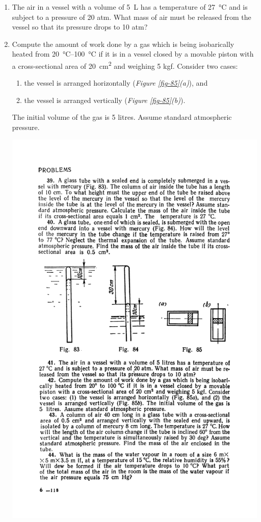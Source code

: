 \documentclass[a4paper,sfsidenotes]{tufte-book}
\begin{document}
\begin{enumerate}[resume=problems]
\item The air in a vessel with a volume of \SI{5}{\liter} has a temperature of \SI{27}{\degreeCelsius} and is subject to a pressure of 20 atm. What mass of air must be released from the vessel so that its pressure drops to 10 atm?
\item Compute the amount of work done by a gas which is being isobarically heated from \SIrange{20}{100}{\degreeCelsius} if it is in a vessel closed by a movable piston with a cross-sectional area of \SI{20}{\centi\meter^{2}} and weighing 5 kgf. Consider two cases: 
\begin{enumerate}
\item the vessel is arranged horizontally (\emph{Figure \ref{fig-85}(a)}), and 
\item the vessel is arranged vertically (\emph{Figure \ref{fig-85}(b)}). 
\end{enumerate}
The initial volume of the gas is 5 litres. Assume standard atmospheric pressure.
\begin{marginfigure}%
\centering
\includegraphics[width=\linewidth]{fig-085a}

\end{marginfigure}
\end{enumerate}
\end{document}
